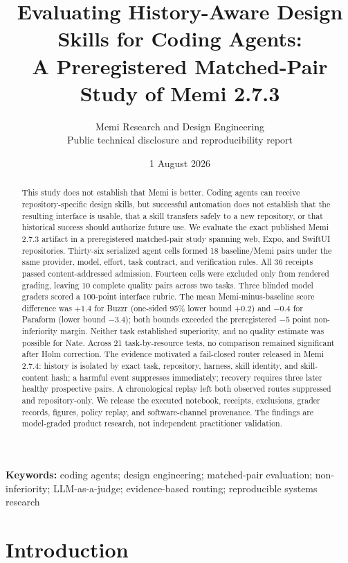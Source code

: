 \documentclass[9pt,twocolumn]{extarticle}
\title{\vspace{-1.2em}\textbf{Evaluating History-Aware Design Skills for Coding Agents:}\\[0.2em]
\large A Preregistered Matched-Pair Study of Memi 2.7.3}
\author{Memi Research and Design Engineering\\
\small Public technical disclosure and reproducibility report}
\date{1 August 2026}
\begin{document}
\color{ink}
\twocolumn[\maketitle\vspace{-1.5em}]

\begin{abstract}
This study does not establish that Memi is better. Coding agents can receive repository-specific design skills, but successful
automation does not establish that the resulting interface is usable, that a
skill transfers safely to a new repository, or that historical success should
authorize future use. We evaluate the exact published Memi 2.7.3 artifact in a
preregistered matched-pair study spanning web, Expo, and SwiftUI repositories.
Thirty-six serialized agent cells formed 18 baseline/Memi pairs under the same
provider, model, effort, task contract, and verification rules. All 36 receipts
passed content-addressed admission. Fourteen cells were excluded only from
rendered grading, leaving 10 complete quality pairs across two tasks. Three
blinded model graders scored a 100-point interface rubric. The mean
Memi-minus-baseline score difference was $+1.4$ for Buzzr (one-sided 95\%
lower bound $+0.2$) and $-0.4$ for Paraform (lower bound $-3.4$); both bounds
exceeded the preregistered $-5$ point non-inferiority margin. Neither task
established superiority, and no quality estimate was possible for Nate. Across
21 task-by-resource tests, no comparison remained significant after Holm
correction. The evidence motivated a fail-closed router released in Memi 2.7.4:
history is isolated by exact task, repository, harness, skill identity, and
skill-content hash; a harmful event suppresses immediately; recovery requires
three later healthy prospective pairs. A chronological replay left both
observed routes suppressed and repository-only. We release the executed
notebook, receipts, exclusions, grader records, figures, policy replay, and
software-channel provenance. The findings are model-graded product research,
not independent practitioner validation.
\end{abstract}

\noindent\textbf{Keywords:} coding agents; design engineering; matched-pair
evaluation; non-inferiority; LLM-as-a-judge; evidence-based routing;
reproducible systems research

\section{Introduction}
\end{document}
